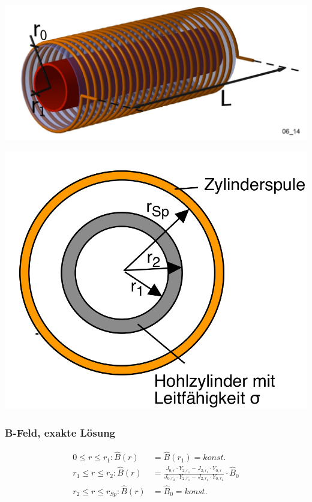 \begin{minipage}[c][][b]{0.475\textwidth}
    \centering
    \includegraphics[width=.8\textwidth]{images/spule-hohlzylinder.png}
\end{minipage}
\begin{minipage}[c][][b]{0.475\textwidth}
    \centering
    \includegraphics[width=.8\textwidth]{images/spule-hohlzylinder-querschnitt.png}
\end{minipage}


\subsubsection{B-Feld, exakte L\"osung}
\label{sec:arbgru:subsec:hohlzylinder:BExact}

\begin{align}
    \label{eq:hohlzylinder:BExact}
    0 \leq r \leq r_1:      \hat{B} (r) & = \hat{B} (r_1) = konst. \\
    r_1 \leq r \leq r_2:    \hat{B} (r) & = \frac{J_{0,r} \cdot Y_{2,r_1} - J_{2,r_1} \cdot Y_{0,r}}{J_{0,r_2} \cdot Y_{2,r_1} - J_{2,r_1} \cdot Y_{0,r_2}} \cdot \hat{B}_0 \\
    r_2 \leq r \leq r_{Sp}: \hat{B} (r) & = \hat{B}_0 = konst.
\end{align}

